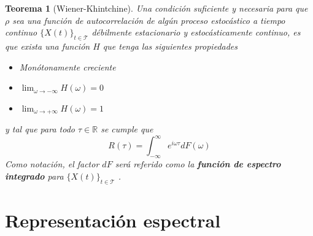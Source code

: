 \documentclass[12pt,letterpaper]{book}
\newtheorem{teorema}{Teorema}[chapter]
\newcommand{\R}{\mathbb{R}}
\newcommand{\intR}{\int_{-\infty}^{\infty}}
\newcommand{\E}[1]{\mathrm{E}\left[ #1 \right]}
\newcommand{\abso}[1]{\left| #1 \right|}
\newcommand{\xt}{$\{X(t)\}_{t\in \mathcal{T}}$ }
\begin{document}
\begin{teorema}[Wiener-Khintchine]
Una condición suficiente y necesaria para que $\rho$ sea una función de autocorrelación de algún proceso estocástico a tiempo continuo \xt débilmente estacionario y estocásticamente continuo, es que exista una función $H$ que tenga las siguientes propiedades
\begin{itemize}
\item Monótonamente creciente
\item $\lim_{\omega\rightarrow -\infty} H(\omega) = 0$
\item $\lim_{\omega\rightarrow +\infty} H(\omega) = 1$
\end{itemize}
y tal que para todo $\tau \in \R$ se cumple que
\begin{equation*}
R(\tau) = \intR e^{i \omega \tau} dF(\omega)
\end{equation*}
Como notación, el factor $dF$ será referido como la \textbf{función de espectro integrado} para \xt.
\label{t_wienerkhinchin}
\end{teorema}



\section{Representación espectral}


\end{document}
